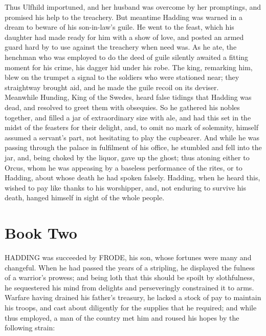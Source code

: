 \documentclass[10pt,a4paper]{report}
\begin{document}
Thus Ulfhild importuned, and her husband was overcome by her promptings, and promised his help to the treachery. But meantime Hadding was warned in a dream to beware of his son-in-law's guile. He went to the feast, which his daughter had made ready for him with a show of love, and posted an armed guard hard by to use against the treachery when need was. As he ate, the henchman who was employed to do the deed of guile silently awaited a fitting moment for his crime, his dagger hid under his robe. The king, remarking him, blew on the trumpet a signal to the soldiers who were stationed near; they straightway brought aid, and he made the guile recoil on its deviser.\\

Meanwhile Hunding, King of the Swedes, heard false tidings that Hadding was dead, and resolved to greet them with obsequies. So he gathered his nobles together, and filled a jar of extraordinary size with ale, and had this set in the midst of the feasters for their delight, and, to omit no mark of solemnity, himself assumed a servant's part, not hesitating to play the cupbearer. And while he was passing through the palace in fulfilment of his office, he stumbled and fell into the jar, and, being choked by the liquor, gave up the ghost; thus atoning either to Orcus, whom he was appeasing by a baseless performance of the rites, or to Hadding, about whose death he had spoken falsely. Hadding, when he heard this, wished to pay like thanks to his worshipper, and, not enduring to survive his death, hanged himself in sight of the whole people.


\chapter{Book Two}

HADDING was succeeded by FRODE, his son, whose fortunes were many and changeful. When he had passed the years of a stripling, he displayed the fulness of a warrior's prowess; and being loth that this should be spoilt by slothfulness, he sequestered his mind from delights and perseveringly constrained it to arms. Warfare having drained his father's treasury, he lacked a stock of pay to maintain his troops, and cast about diligently for the supplies that he required; and while thus employed, a man of the country met him and roused his hopes by the following strain:\\
\end{document}
